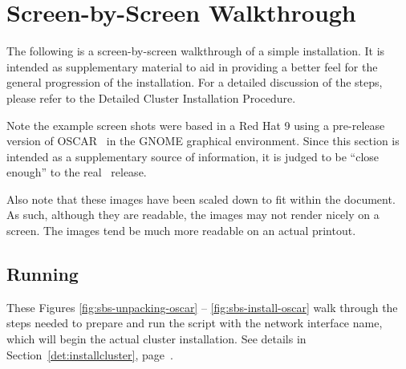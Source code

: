 %
% 
%
%
%


\newpage

\section{Screen-by-Screen Walkthrough}
\label{app:screen-by-screen}

The following is a screen-by-screen walkthrough of a simple installation.
It is intended as supplementary material to aid in providing a better feel
for the general progression of the installation.  For a detailed discussion
of the steps, please refer to the Detailed Cluster Installation Procedure. 

Note the example screen shots were based in a Red Hat 9 using a
pre-release version of OSCAR \oscarversion\ in the GNOME graphical
environment.  Since this section is intended as a supplementary source
of information, it is judged to be ``close enough'' to the real
\oscarversion\ release.  

Also note that these images have been scaled down to fit within the
document.  As such, although they are readable, the images may not
render nicely on a screen.  The images tend be much more readable on
an actual printout.



\subsection{Running }


These Figures \ref{fig:sbs-unpacking-oscar} -- \ref{fig:sbs-install-oscar}
walk through the steps needed to prepare and run the 
script with the network interface name, which will begin the actual cluster
installation.  See details in Section~\ref{det:installcluster},
page~\pageref{det:installcluster}.

